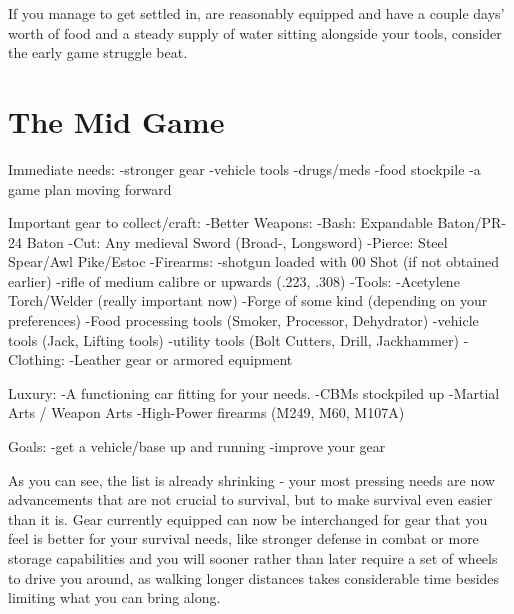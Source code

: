 \documentclass[11pt]{report}
\begin{document}
If you manage to get settled in, are reasonably equipped and have a couple days' worth of food and a steady supply of water sitting alongside your tools, consider the early game struggle beat.

\section{The Mid Game}

Immediate needs:
-stronger gear
-vehicle tools
-drugs/meds
-food stockpile
-a game plan moving forward

Important gear to collect/craft:
-Better Weapons:
	-Bash: Expandable Baton/PR-24 Baton
	-Cut: Any medieval Sword (Broad-, Longsword)
	-Pierce: Steel Spear/Awl Pike/Estoc
-Firearms:
	-shotgun loaded with 00 Shot (if not obtained earlier)
	-rifle of medium calibre or upwards (.223, .308)
-Tools:
	-Acetylene Torch/Welder (really important now)
	-Forge of some kind (depending on your preferences)
	-Food processing tools (Smoker, Processor, Dehydrator)
	-vehicle tools (Jack, Lifting tools)
	-utility tools (Bolt Cutters, Drill, Jackhammer)
-Clothing:
	-Leather gear or armored equipment

Luxury:
-A functioning car fitting for your needs.
-CBMs stockpiled up
-Martial Arts / Weapon Arts
-High-Power firearms (M249, M60, M107A)

Goals:
-get a vehicle/base up and running
-improve your gear

As you can see, the list is already shrinking - your most pressing needs are now advancements that are not crucial to survival, but to make survival even easier than it is. Gear currently equipped can now be interchanged for gear that you feel is better for your survival needs, like stronger defense in combat or more storage capabilities and you will sooner rather than later require a set of wheels to drive you around, as walking longer distances takes considerable time besides limiting what you can bring along.
\end{document}
